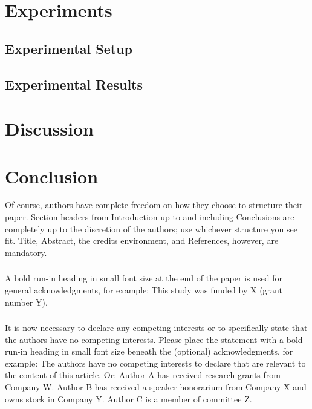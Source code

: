 \documentclass[
  runningheads]{llncs}
\begin{document}
\begin{table}[t]
{\section{Experiments}\label{experiments}

\subsection{Experimental Setup}\label{experimental-setup}

\subsection{Experimental Results}\label{experimental-results}

\section{Discussion}\label{discussion}

\section{Conclusion}\label{conclusion}

Of course, authors have complete freedom on how they choose to structure
their paper. Section headers from Introduction up to and including
Conclusions are completely up to the discretion of the authors; use
whichever structure you see fit. Title, Abstract, the credits
environment, and References, however, are mandatory.

\begin{credits}
\subsubsection{\ackname} A bold run-in heading in small font size at the end of the paper is
used for general acknowledgments, for example: This study was funded
by X (grant number Y).

\subsubsection{\discintname}
It is now necessary to declare any competing interests or to specifically
state that the authors have no competing interests. Please place the
statement with a bold run-in heading in small font size beneath the
(optional) acknowledgments,
for example: The authors have no competing interests to declare that are
relevant to the content of this article. Or: Author A has received research
grants from Company W. Author B has received a speaker honorarium from
Company X and owns stock in Company Y. Author C is a member of committee Z.
\end{credits}

}

\end{table}%



\end{document}
